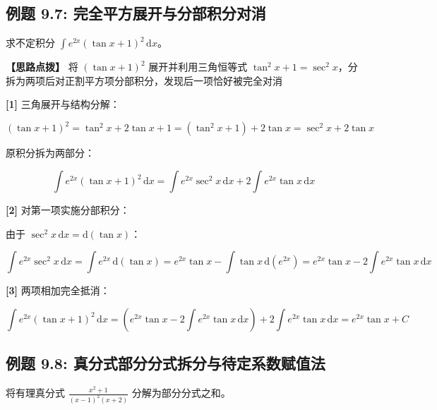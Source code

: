 \documentclass[11pt,a4paper,UTF8]{ctexart}
\begin{document}
\subsection{例题 9.7: 完全平方展开与分部积分对消}

求不定积分 $\int e^{2x}(\tan x + 1)^2\,\mathrm{d}x$。

\textbf{\color{DeepPurple}【思路点拨】} 将 $(\tan x + 1)^2$ 展开并利用三角恒等式 $\tan^2 x + 1 = \sec^2 x$，分拆为两项后对正割平方项分部积分，发现后一项恰好被完全对消


\begin{solbox}[分步推导与答题规范]
\textbf{[1]} 三角展开与结构分解：


\begin{equation*}
(\tan x + 1)^2 = \tan^2 x + 2\tan x + 1 = (\tan^2 x + 1) + 2\tan x = \sec^2 x + 2\tan x
\end{equation*}


原积分拆为两部分：


\begin{equation*}
\int e^{2x}(\tan x + 1)^2\,\mathrm{d}x = \int e^{2x}\sec^2 x\,\mathrm{d}x + 2\int e^{2x}\tan x\,\mathrm{d}x
\end{equation*}


\textbf{[2]} 对第一项实施分部积分：

由于 $\sec^2 x\,\mathrm{d}x = \mathrm{d}(\tan x)$：


\begin{equation*}
\int e^{2x}\sec^2 x\,\mathrm{d}x = \int e^{2x}\,\mathrm{d}(\tan x) = e^{2x}\tan x - \int \tan x\,\mathrm{d}(e^{2x}) = e^{2x}\tan x - 2\int e^{2x}\tan x\,\mathrm{d}x
\end{equation*}


\textbf{[3]} 两项相加完全抵消：


\begin{equation*}
\int e^{2x}(\tan x + 1)^2\,\mathrm{d}x = \left(e^{2x}\tan x - 2\int e^{2x}\tan x\,\mathrm{d}x\right) + 2\int e^{2x}\tan x\,\mathrm{d}x = e^{2x}\tan x + C
\end{equation*}

\end{solbox}


\subsection{例题 9.8: 真分式部分分式拆分与待定系数赋值法}

将有理真分式 $\frac{x^2+1}{(x-1)^2(x+2)}$ 分解为部分分式之和。
\end{document}
